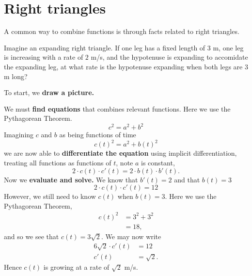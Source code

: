 \documentclass{ximera}
\begin{document}
\section{Right triangles}

A common way to combine functions is through facts related to right
triangles.


\begin{example}
  Imagine an expanding right triangle. If one leg has a fixed length
  of $3$ m, one leg is increasing with a rate of $2$ m/s, and the
  hypotenuse is expanding to accomidate the expanding leg, at what
  rate is the hypotenuse expanding when both legs are $3$ m long?
  \begin{explanation}
    To start, we \textbf{draw a picture.}
    \begin{image}
    \end{image}

    We must \textbf{find equations} that combines relevant
    functions. Here we use the Pythagorean Theorem.
    \[
    c^2 = a^2 + b^2
    \]
    Imagining $c$ and $b$ as being functions of time
    \[
    c(t)^2 = a^2 + b(t)^2
    \]
    we are now able to \textbf{differentiate the equation} using
    implicit differentiation, treating all functions as functions of
    $t$, note $a$ is constant,
    \[
    2\cdot c(t)\cdot c'(t) = 2\cdot b(t)\cdot b'(t).
    \]
    Now we \textbf{evaluate and solve.} We
    know that $b'(t) = 2$ and that $b(t) = 3$
    \[
    2\cdot c(t)\cdot c'(t) = 12
    \]
    However, we still need to know $c(t)$ when $b(t) = 3$. Here we use
    the Pythagorean Theorem,
    \begin{align*}
    c(t)^2 &= 3^2 + 3^2\\
    &=18,
    \end{align*}
    and so we see that $c(t) = 3\sqrt{2}$. We may now write
    \begin{align*}
      6\sqrt{2}\cdot c'(t) &= 12 \\
      c'(t) &= \sqrt{2}.
    \end{align*}
    Hence $c(t)$ is growing at a rate of $\sqrt{2}$ m/s.
  \end{explanation}
\end{example}
\end{document}
